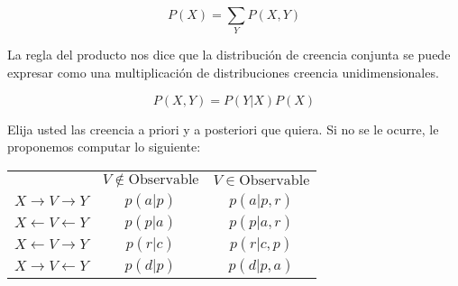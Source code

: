 \begin{equation}
 P(X) = \sum_Y P(X,Y) 
\end{equation}

La regla del producto nos dice que la distribuci\'on de creencia conjunta se puede expresar como una multiplicaci\'on de distribuciones creencia unidimensionales.

\begin{equation}
P(X,Y) = P(Y|X) P(X) 
\end{equation}

Elija usted las creencia a priori y a posteriori que quiera.
Si no se le ocurre, le proponemos computar lo siguiente:

\begin{table}[H]
\centering
 \begin{tabular}{c c|c}
          & $V \notin \text{Observable} $ &  $V \in \text{Observable} $ \\
 $X \rightarrow V \rightarrow Y $    &  $p(a|p)$ & $p(a|p,r)$ \\ 
 $X \leftarrow V \leftarrow Y $      &  $p(p|a)$ & $p(p|a,r)$ \\ 
 $X \leftarrow V \rightarrow Y $     &  $p(r|c)$ & $p(r|c,p)$ \\
 $X \rightarrow V \leftarrow Y $     &  $p(d|p)$ & $p(d|p,a)$
 \end{tabular} 
\end{table}


